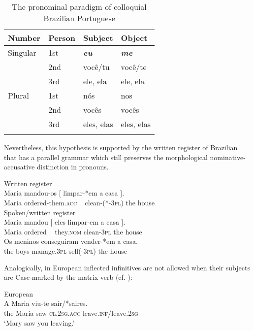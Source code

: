 \documentclass[output=paper]{langsci/langscibook}
\begin{document}
\begin{table}
\caption{\label{tab:moreno:1}The pronominal paradigm of colloquial Brazilian Portuguese}
\begin{tabular}{llll}
\lsptoprule
{Number}   & Person & Subject & Object\\\midrule
{Singular} & 1st & \textbf{\textit{eu}} & \textbf{\textit{me}}\\
           & 2nd & você/tu & você/te\\
           & 3rd & ele, ela & ele, ela\\\midrule
{Plural}   & 1st & nós & nos\\
           & 2nd & vocês & vocês\\
           & 3rd & eles, elas & eles, elas\\
\lspbottomrule
\end{tabular}
\end{table}

Nevertheless, this hypothesis is supported by the written register of Brazilian  that has a parallel grammar which still preserves the morphological nominative-accusative distinction in pronouns.

\ea%
    \label{ex:moreno:24}
    \ea  Written register\\
    \gll Maria mandou-os     [  limpar-*em    a    casa ].   \\
         Maria ordered-them.\textsc{acc}   ~    clean-(*-\textsc{3pl}) the house\\
    \ex  Spoken/written register\\
    \gll Maria mandou [ eles   limpar-em a    casa ].   \\
         Maria ordered  ~  they.\textsc{nom} clean-\textsc{3pl}  the house \\
    \ex  
    \gll Os meninos conseguiram  vender-*em  a    casa. \\
         the boys      manage.\textsc{3pl}    sell(-\textsc{3pl})     the house \\
\z
\z

Analogically, in European  inflected infinitives are not allowed when their subjects are Case-marked by the matrix verb (cf. \citealt{Hornstein2008}):

\ea%
         European \label{ex:moreno:25}\\
    \gll A   Maria viu-te           sair/*saires.\\
         the Maria saw-\textsc{cl.2sg.acc} leave.\textsc{inf}/leave.\textsc{2sg}\\
    \glt ‘Mary saw you leaving.’
\z
\end{document}
